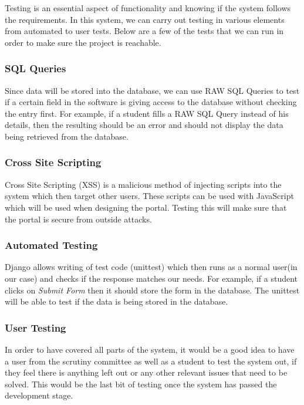 \documentclass[../main.tex]{subfiles}
\begin{document}
\raggedright

Testing is an essential aspect of functionality and knowing if the system follows the requirements. In this system, we can carry out testing in various elements from automated to user tests. Below are a few of the tests that we can run in order to make sure the project is reachable.

\subsubsection{SQL Queries}
Since data will be stored into the database, we can use RAW SQL Queries to test if a certain field in the software is giving access to the database without checking the entry first. For example, if a student fills a RAW SQL Query instead of his details, then the resulting should be an error and should not display the data being retrieved from the database. 

\subsubsection{Cross Site Scripting}
Cross Site Scripting (XSS) is a malicious method of injecting scripts into the system which then target other users. These scripts can be used with JavaScript which will be used when designing the portal. Testing this will make sure that the portal is secure from outside attacks. 

\subsubsection{Automated Testing}
Django allows writing of test code (unittest)\cite{djangoTesting} which then runs as a normal user(in our case) and checks if the response matches our needs. For example, if a student clicks on \textit{Submit Form} then it should store the form in the database. The unittest will be able to test if the data is being stored in the database. 

\subsubsection{User Testing}
In order to have covered all parts of the system, it would be a good idea to have a user from the scrutiny committee as well as a student to test the system out, if they feel there is anything left out or any other relevant issues that need to be solved. This would be the last bit of testing once the system has passed the development stage.
\end{document}

